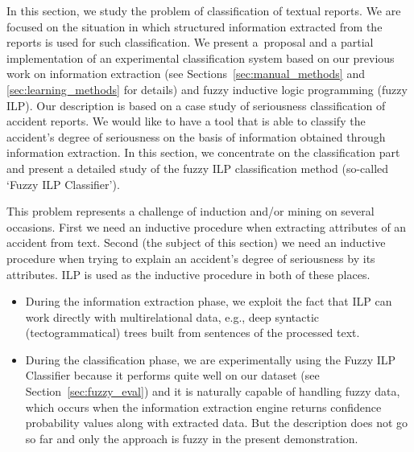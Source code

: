 In this section, we study the problem of classification of textual reports. We are %
 focused on the situation in which structured information extracted from the reports is used for such classification. We present a~proposal and a partial implementation of an experimental classification system based on our previous work on information extraction (see Sections~\ref{sec:manual_methods} and \ref{sec:learning_methods} for details) and fuzzy inductive logic programming (fuzzy ILP).
Our description is based on a case study of seriousness classification of accident reports. 
We would like to have a tool that is able to classify the accident's degree of seriousness on the basis of information obtained through information extraction.
In this section,
we concentrate on the classification part and present a detailed study of the fuzzy ILP classification method (so-called `Fuzzy ILP Classifier'). 

This problem represents a challenge of induction and/or mining on several occasions. First we need an inductive procedure when extracting attributes of an accident from text. Second (the subject of this section) we need an inductive procedure when trying to explain an accident's degree of seriousness by its attributes. ILP is used as the inductive procedure in both of these places.
\begin{itemize}
	\item During the information extraction phase, we exploit the fact that ILP can work directly with multirelational data, e.g., deep syntactic (tectogrammatical) trees built from sentences of the processed text.
	\item During the classification phase, we are experimentally using the Fuzzy ILP Classifier because it performs quite well on our dataset (see Section~\ref{sec:fuzzy_eval}) and it is naturally capable of handling fuzzy data, which occurs when the information extraction engine returns confidence probability values along with extracted data. But the description does not go so far and only the approach is fuzzy in the present demonstration.
\end{itemize}


